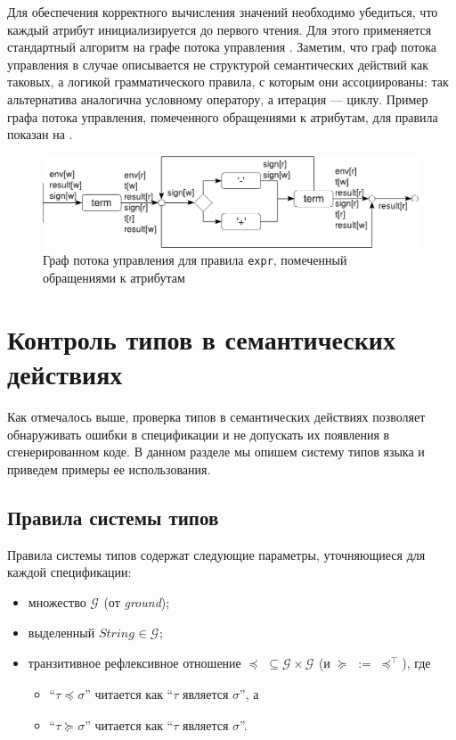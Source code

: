 Для обеспечения корректного вычисления значений необходимо убедиться, что каждый атрибут инициализируется до первого чтения. Для этого применяется стандартный алгоритм на графе потока управления \cite{???}. 
Заметим, что граф потока управления в случае \ATF{} описывается не структурой семантических действий как таковых, а логикой грамматического правила, с которым они ассоциированы: так альтернатива аналогична условному оператору, а итерация --- циклу. Пример графа потока управления, помеченного обращениями к атрибутам, для правила  показан на .
\begin{figure}[htbp]
	\centering
	\includegraphics[width=\textwidth]{cfg.pdf}
	\caption{Граф потока управления для правила \texttt{expr}, помеченный обращениями к атрибутам}\label{cfg}
\end{figure}

\chapter{Контроль типов в семантических действиях}

Как отмечалось выше, проверка типов в семантических действиях позволяет обнаруживать ошибки в спецификации и не допускать их появления в сгенерированном коде. В данном разделе мы опишем систему типов языка \ATF{} и приведем примеры ее использования.

\section{Правила системы типов}

\renewcommand{\L}{{}}
\newcommand{\G}{ {\mathcal{G}_\L} }
\newcommand{\eql}{\cong_\L}
\newcommand{\lel}{\preceq_\L}
\newcommand{\gel}{\succeq_\L}
\newcommand{\TUP}{TupleType}
\newcommand{\Str}{String_\L}

Правила системы типов \ATF{} содержат следующие параметры, уточняющиеся для каждой спецификации:
\begin{itemize}
\item множество  $\G$ (от \emph{ground});
\item выделенный  $\Str \in \G$;
\item транзитивное рефлексивное отношение $\lel \;\subseteq \G \times \G$ (и $\gel \;:=\; \lel^{\top}$), где 
	\begin{itemize}
	\item ``$\tau \lel \sigma$''
читается как ``$\tau$ является  $\sigma$'', а
	\item ``$\tau \gel \sigma$''
читается как ``$\tau$ является  $\sigma$''.
	\end{itemize}
\end{itemize}

